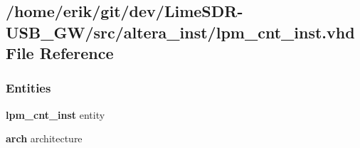 \subsection{/home/erik/git/dev/\+Lime\+S\+D\+R-\/\+U\+S\+B\+\_\+\+G\+W/src/altera\+\_\+inst/lpm\+\_\+cnt\+\_\+inst.vhd File Reference}
\label{src_2altera__inst_2lpm__cnt__inst_8vhd}
\subsubsection*{Entities}
\begin{DoxyCompactItemize}
\item 
{\bf lpm\+\_\+cnt\+\_\+inst} entity
\item 
{\bf arch} architecture
\end{DoxyCompactItemize}
